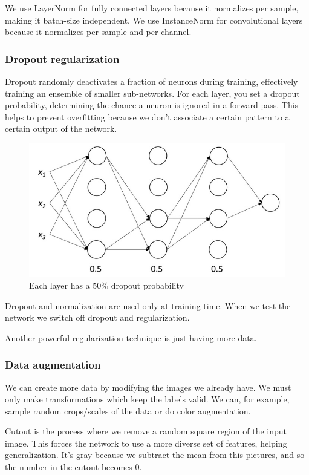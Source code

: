 We use LayerNorm for fully connected layers because it normalizes per sample, making it batch-size independent.
We use InstanceNorm for convolutional layers because it normalizes per sample and per channel.

\subsubsection{Dropout regularization}
Dropout randomly deactivates a fraction of neurons during training, effectively training an ensemble of smaller sub-networks.
For each layer, you set a dropout probability, determining the chance a neuron is ignored in a forward pass.
This helps to prevent overfitting because we don't associate a certain pattern to a certain output of the network.

\begin{figure}[htbp]
  \centering
  \includegraphics[width=0.8\linewidth]{./img/dropout.jpg}
  \caption{Each layer has a $50 \%$ dropout probability}
  \label{fig:dropout}
\end{figure}

Dropout and normalization are used only at training time.
When we test the network we switch off dropout and regularization.

Another powerful regularization technique is just having more data.

\subsubsection{Data augmentation}
We can create more data by modifying the images we already have.
We must only make transformations which keep the labels valid.
We can, for example, sample random crops/scales of the data or do color augmentation.

Cutout is the process where we remove a random square region of the input image.
This forces the network to use a more diverse set of features, helping generalization.
It's gray because we subtract the mean from this pictures, and so the number in the cutout becomes 0.

